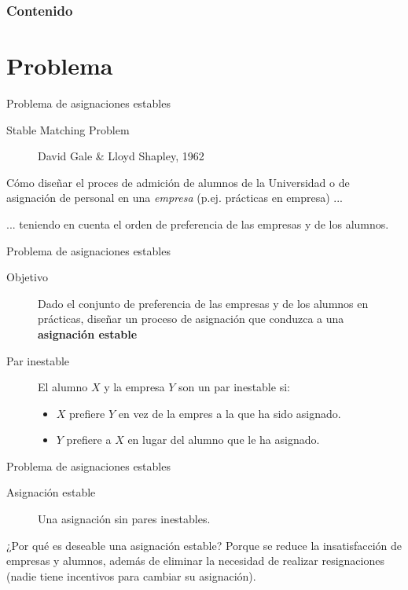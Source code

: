 \begin{frame}
    \frametitle{Contenido}
    \tableofcontents
\end{frame}

\section{Problema}

\begin{frame}[c]{Problema de asignaciones estables}
  \begin{description}
    \item[Stable Matching Problem] David Gale \& Lloyd Shapley, 1962
  \end{description}

  \vspace{\baselineskip}
  Cómo diseñar el proces de admición de alumnos de la Universidad o de
  asignación de personal en una \textit{empresa}
  (p.ej. prácticas en empresa) ...

  \vspace{\baselineskip}
  ... teniendo en cuenta el orden de preferencia de las empresas y de los
  alumnos.
\end{frame}

\begin{frame}[c]{Problema de asignaciones estables}
  \begin{description}
    \item[Objetivo] Dado el conjunto de preferencia de las empresas y de los
      alumnos en prácticas, diseñar un proceso de asignación que conduzca a una
      \textbf{asignación estable}
    \vspace{\baselineskip}
    \item[Par inestable] El alumno $X$ y la empresa $Y$ son un par inestable si:
      \begin{itemize}
        \item $X$ prefiere $Y$ en vez de la empres a la que ha sido asignado.
        \item $Y$ prefiere a $X$ en lugar del alumno que le ha asignado.
      \end{itemize}
  \end{description}
\end{frame}

\begin{frame}[c]{Problema de asignaciones estables}
  \begin{description}
    \item[Asignación estable] Una asignación sin pares inestables.
  \end{description}

  \vspace{\baselineskip}
  \begin{block}{¿Por qué es deseable una asignación estable?}
    Porque se reduce la insatisfacción de empresas y alumnos, además de eliminar
    la necesidad de realizar resignaciones (nadie tiene incentivos para cambiar
    su asignación).
  \end{block}
\end{frame}

